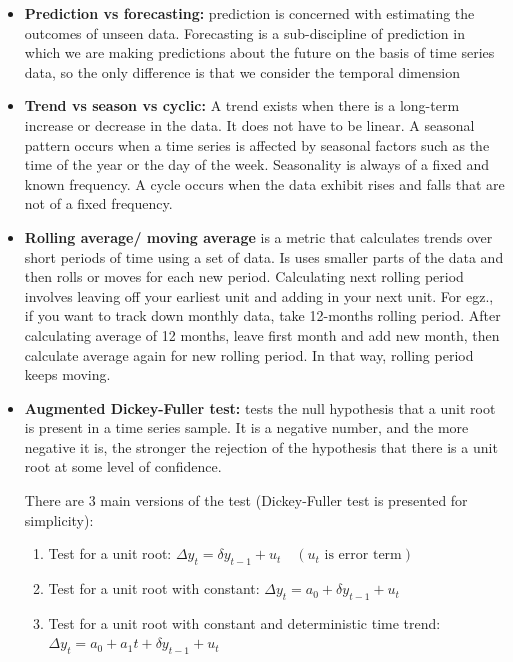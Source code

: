 \documentclass[
  letterpaper,
]{book}
\providecommand{\tightlist}{%
  \setlength{\itemsep}{0pt}\setlength{\parskip}{0pt}}\usepackage{longtable,booktabs,array}
\begin{document}
\begin{itemize}
\item
  \textbf{Prediction vs forecasting:} prediction is concerned with
  estimating the outcomes of unseen data. Forecasting is a
  sub-discipline of prediction in which we are making predictions about
  the future on the basis of time series data, so the only difference is
  that we consider the temporal dimension
\item
  \textbf{Trend vs season vs cyclic:} A trend exists when there is a
  long-term increase or decrease in the data. It does not have to be
  linear. A seasonal pattern occurs when a time series is affected by
  seasonal factors such as the time of the year or the day of the week.
  Seasonality is always of a fixed and known frequency. A cycle occurs
  when the data exhibit rises and falls that are not of a fixed
  frequency.
\item
  \textbf{Rolling average/ moving average} is a metric that calculates
  trends over short periods of time using a set of data. Is uses smaller
  parts of the data and then rolls or moves for each new period.
  Calculating next rolling period involves leaving off your earliest
  unit and adding in your next unit. For egz., if you want to track down
  monthly data, take 12-months rolling period. After calculating average
  of 12 months, leave first month and add new month, then calculate
  average again for new rolling period. In that way, rolling period
  keeps moving.
\item
  \textbf{Augmented Dickey-Fuller test:} tests the null hypothesis that
  a unit root is present in a time series sample. It is a negative
  number, and the more negative it is, the stronger the rejection of the
  hypothesis that there is a unit root at some level of confidence.

  There are 3 main versions of the test (Dickey-Fuller test is presented
  for simplicity):

  \begin{enumerate}
  \def\labelenumi{\arabic{enumi}.}
  \tightlist
  \item
    Test for a unit root:
    \(\Delta y_{t} = \delta y_{t-1} + u_{t} \quad(u_{t} \text{ is error term})\)
  \item
    Test for a unit root with constant:
    \(\Delta y_{t} = a_{0} + \delta y_{t-1} + u_{t}\)
  \item
    Test for a unit root with constant and deterministic time trend:
    \(\Delta y_{t} = a_{0} + a_{1}t + \delta y_{t-1} + u_{t}\)
  \end{enumerate}


\end{itemize}
\end{document}
